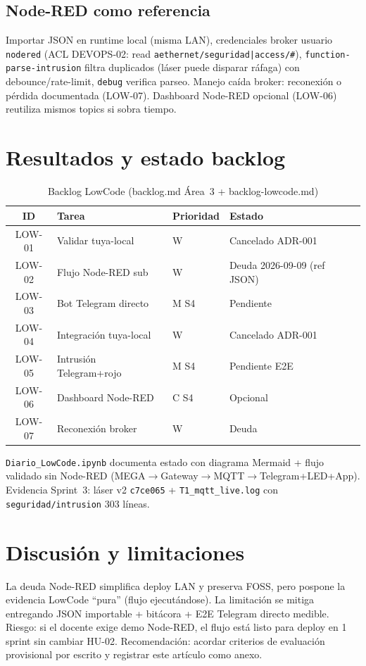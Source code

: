 \documentclass[conference]{IEEEtran}
\begin{document}
\subsection{Node-RED como referencia}
Importar JSON en runtime local (misma LAN), credenciales broker usuario \texttt{nodered} (ACL DEVOPS-02: read \texttt{aethernet/seguridad|access/\#}), \texttt{function-parse-intrusion} filtra duplicados (láser puede disparar ráfaga) con debounce/rate-limit, \texttt{debug} verifica parseo. Manejo caída broker: reconexión o pérdida documentada (LOW-07). Dashboard Node-RED opcional (LOW-06) reutiliza mismos topics si sobra tiempo.

\section{Resultados y estado backlog}
\begin{table}[t]
\centering
\caption{Backlog LowCode (backlog.md Área~3 + backlog-lowcode.md)}
\label{tab:low}
\begin{tabular}{@{}clll@{}}
\toprule
ID & Tarea & Prioridad & Estado \\
\midrule
LOW-01 & Validar tuya-local & W & Cancelado ADR-001 \\
LOW-02 & Flujo Node-RED sub & W & Deuda 2026-09-09 (ref JSON) \\
LOW-03 & Bot Telegram directo & M S4 & Pendiente \\
LOW-04 & Integración tuya-local & W & Cancelado ADR-001 \\
LOW-05 & Intrusión Telegram+rojo & M S4 & Pendiente E2E \\
LOW-06 & Dashboard Node-RED & C S4 & Opcional \\
LOW-07 & Reconexión broker & W & Deuda \\
\bottomrule
\end{tabular}
\end{table}
\texttt{Diario\_LowCode.ipynb} documenta estado con diagrama Mermaid + flujo validado sin Node-RED (MEGA$\rightarrow$Gateway$\rightarrow$MQTT$\rightarrow$Telegram+LED+App). Evidencia Sprint~3: láser v2 \texttt{c7ce065} + \texttt{T1\_mqtt\_live.log} con \texttt{seguridad/intrusion} 303 líneas.

\section{Discusión y limitaciones}
La deuda Node-RED simplifica deploy LAN y preserva FOSS, pero pospone la evidencia LowCode ``pura'' (flujo ejecutándose). La limitación se mitiga entregando JSON importable + bitácora + E2E Telegram directo medible. Riesgo: si el docente exige demo Node-RED, el flujo está listo para deploy en 1 sprint sin cambiar HU-02. Recomendación: acordar criterios de evaluación provisional por escrito y registrar este artículo como anexo.
\end{document}
